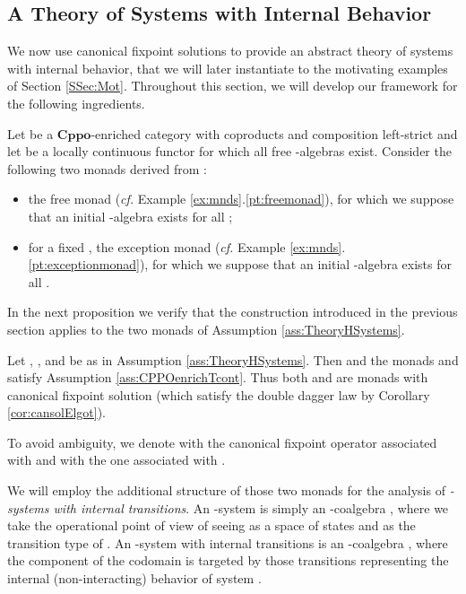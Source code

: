 \documentclass[oribibl,envcountsame,envcountsect,runningheads]{llncs}
\newcommand{\cat}[1]{\ensuremath{\mathbf{#1}}}
\newcommand{\cppo}{\cat{Cppo}}
\renewcommand{\>}{\rangle}
\begin{document}
\subsection{A Theory of Systems with Internal Behavior}

We now use canonical fixpoint solutions to provide an abstract theory of systems with internal behavior, that we will later instantiate to the motivating examples of Section \ref{SSec:Mot}. Throughout this section, we will develop our framework for the following ingredients.

\begin{assumption} \label{ass:TheoryHSystems} Let  be a \cppo-enriched category with coproducts and composition left-strict and let  be a locally continuous functor for which all free -algebras exist. Consider the following two monads derived from :
\begin{itemize}
  \item the free monad  (\emph{cf.} Example \ref{ex:mnds}.\ref{pt:freemonad}), for which we suppose that an initial -algebra exists for all ;
  \item for a fixed , the exception monad  (\emph{cf.} Example \ref{ex:mnds}.\ref{pt:exceptionmonad}), for which we suppose that an initial -algebra exists for all .
\end{itemize}
\end{assumption}
In the next proposition we verify that the construction introduced in the previous section applies to the two monads of Assumption \ref{ass:TheoryHSystems}.
\newcommand{\propass}{Let , ,   and   be as in Assumption \ref{ass:TheoryHSystems}. Then  and the monads  and  satisfy Assumption \ref{ass:CPPOenrichTcont}. Thus both  and   are monads with canonical fixpoint solution (which satisfy the double dagger law by Corollary \ref{cor:cansolElgot}).}
 \begin{proposition}\label{prop:ass2->ass1}
 \propass
 \end{proposition}
To avoid ambiguity, we denote with  the canonical fixpoint operator associated with  and with  the one associated with .

We will employ the additional structure of those two monads for the analysis of \emph{-systems with internal transitions}. An -system is simply an -coalgebra , where we take the operational point of view of seeing  as a space of states and  as the transition type of . An -system with internal transitions is an -coalgebra , where the component  of the codomain is targeted by those transitions representing the internal (non-interacting) behavior of system .
\end{document}
